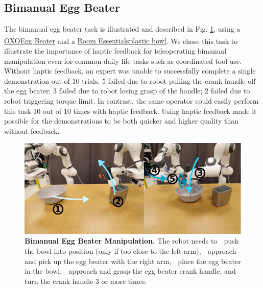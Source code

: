 \documentclass[Afour,sageh,times]{sagej}
\newcommand{\legalTM}{\textsuperscript{\texttrademark}}
\begin{document}
\subsection{Bimanual Egg Beater}

The bimanual egg beater task is illustrated and described in Fig. \ref{fig:real_egg_beater}, using a
\href{https://www.oxo.com/egg-beater.html}{OXO\legalTM Egg Beater} and a
\href{https://www.target.com/p/114oz-plastic-serving-bowl-jet-gray-room-essentials-8482/-/A-86701588}{Room Essentials\legalTM plastic bowl}. We chose this task to illustrate the importance of haptic feedback for teleoperating bimanual manipulation even for common daily life tasks such as coordinated tool use. Without haptic feedback, an expert was unable to successfully complete a single demonstration out of 10 trials. 5 failed due to robot pulling the crank handle off the egg beater; 3 failed due to robot losing grasp of the handle; 2 failed due to robot triggering torque limit. In contrast, the same operator could easily perform this task 10 out of 10 times with haptic feedback. Using haptic feedback made it possible for the demonstrations to be both quicker and higher quality than without feedback.

\begin{figure}[t]
\centering
\includegraphics[width=\linewidth]{figure/real_egg_beater_setup_compressed.pdf}
\caption{\textbf{Bimanual Egg Beater Manipulation. } 
\label{fig:real_egg_beater}
The robot needs to
\textcircled{} push the bowl into position (only if too close to the left arm),
\textcircled{} approach and pick up the egg beater with the right arm,
\textcircled{} place the egg beater in the bowl,
\textcircled{} approach and grasp the egg beater crank handle, and
\textcircled{} turn the crank handle 3 or more times.
}
\vspace{-4mm}
\end{figure}
\end{document}
